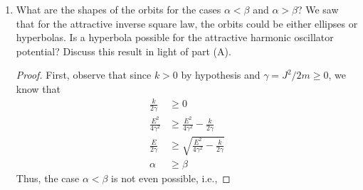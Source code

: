 \documentclass[../psets.tex]{subfiles}
\begin{document}
\begin{enumerate}
\begin{enumerate}
\begin{proof}
\begin{align*}
            \end{align*}
            Substitute in the new variables and rearrange to obtain
            \begin{align*}
                \frac{1}{4}\left( \dv{z}{\theta} \right)^2+z^2 &= \beta^2\\
                \left( \dv{z}{\theta} \right)^2+(2z)^2 &= (2\beta)^2
            \end{align*}
            The solution to this differential equation is
            \begin{equation*}
                z = \beta\cos(2(\theta-\theta_0))
            \end{equation*}
            where $\theta_0$ is a constant of integration. In this case, we will choose $\theta_0=0$. Setting the above equal to the definition of $z$, returning previous substitutions, and simplifying allows us to find the final trajectories, as desired.
            \begin{align*}
                \beta\cos(2\theta) &= v-\alpha\\
                \alpha\cdot 1+\beta(\cos^2\theta-\sin^2\theta) &= u^2\\
                \alpha(\cos^2\theta+\sin^2\theta)+\beta\cos^2\theta-\beta\sin^2\theta &= \frac{1}{r^2}\\
                r^2[(\beta+\alpha)\cos^2\theta+(\alpha-\beta)\sin^2\theta] &= 1
            \end{align*}
        \end{proof}
        \item What are the shapes of the orbits for the cases $\alpha<\beta$ and $\alpha>\beta$? We saw that for the attractive inverse square law, the orbits could be either ellipses or hyperbolas. Is a hyperbola possible for the attractive harmonic oscillator potential? Discuss this result in light of part (A).
        \begin{proof}
            First, observe that since $k>0$ by hypothesis and $\gamma=J^2/2m\geq 0$, we know that
            \begin{align*}
                \frac{k}{2\gamma} &\geq 0\\
                \frac{E^2}{4\gamma^2} &\geq \frac{E^2}{4\gamma^2}-\frac{k}{2\gamma}\\
                \frac{E}{2\gamma} &\geq \sqrt{\frac{E^2}{4\gamma^2}-\frac{k}{2\gamma}}\\
                \alpha &\geq \beta
            \end{align*}
            Thus, the case $\alpha<\beta$ is not even possible, i.e., \par

\end{proof}
\end{enumerate}
\end{enumerate}
\end{document}
